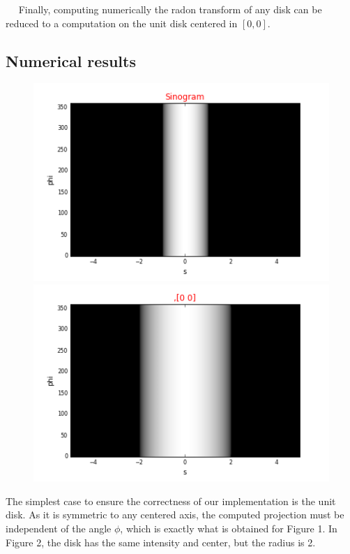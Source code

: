 \documentclass[a4,12pt]{article}
\begin{document}
~~ Finally, computing numerically the radon transform of any disk can be reduced to a computation on the unit disk centered in $[0,0]$. 
\subsection{Numerical results}
\begin{figure}[h!]
   \begin{minipage}[c]{.46\linewidth}
      \includegraphics[scale=0.5]{../images/sinograms/unitDisk.png} 
   \end{minipage} \hfill
   \begin{minipage}[c]{.46\linewidth}
      \includegraphics[scale=0.5]{../images/sinograms/scaledUnitDisk.png}
   \end{minipage}
\end{figure}

The simplest case to ensure the correctness of our implementation is the unit disk. As it is symmetric to any centered axis, the computed projection must be independent of the angle $\phi$, which is exactly what is obtained for Figure 1. In Figure 2, the disk has the same intensity and center, but the radius is 2.  \\
\end{document}
